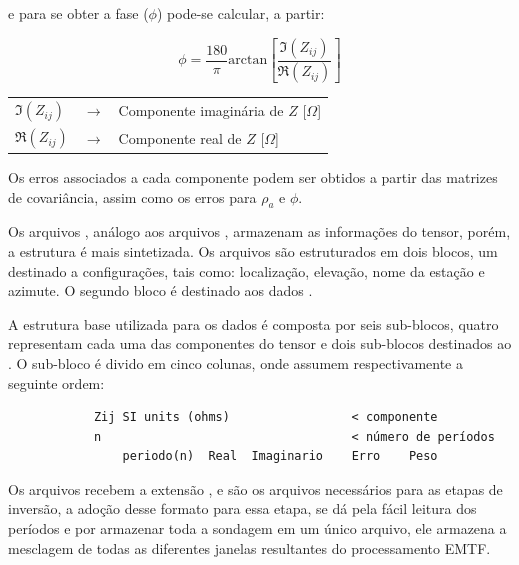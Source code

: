         \noindent e para se obter a fase ($\phi$) pode-se calcular, a partir:
        
        \begin{equation}
         \phi = \dfrac{180}{\pi} \textrm{arctan}\left [\dfrac{\Im(Z_{ij})}{\Re(Z_{ij})} \right ]
        \end{equation}

        {\footnotesize \noindent
            \begin{table}[H]
                \begin{tabular*}{5cm}{p{.9cm}p{0.1cm}p{10cm}}
                    {\footnotesize $\Im(Z_{ij})$}  & {\footnotesize $\rightarrow$} & {\footnotesize Componente imaginária de $Z$ [$\Omega$]}\\
                    {\footnotesize $\Re(Z_{ij})$}  & {\footnotesize $\rightarrow$} & {\footnotesize Componente real de  $Z$ [$\Omega$]}\\
                \end{tabular*}
            \end{table}}
        
        Os erros associados a cada componente podem ser obtidos a partir das matrizes de covariância, assim como os erros para $\rho_a$ e $\phi$.
        
        Os arquivos , análogo aos arquivos , armazenam as informações do tensor, porém, a estrutura é mais sintetizada. Os arquivos são estruturados em dois blocos, um destinado a configurações, tais como: localização, elevação, nome da estação e azimute. O segundo bloco é destinado aos dados \cite{j-format}.
        
        A estrutura base utilizada para os dados é composta por seis sub-blocos, quatro representam cada uma das componentes do tensor e dois sub-blocos destinados ao . O sub-bloco é divido em cinco colunas, onde assumem respectivamente a seguinte ordem: 
        
\begin{footnotesize}        
\begin{verbatim}
            Zij SI units (ohms)                 < componente
            n                                   < número de períodos
                periodo(n)  Real  Imaginario    Erro    Peso
\end{verbatim}
\end{footnotesize}
               
        Os arquivos  recebem a extensão , e são os arquivos necessários para as etapas de inversão, a adoção desse formato para essa etapa, se dá pela fácil leitura dos períodos e por armazenar toda a sondagem em um único arquivo, ele armazena a mesclagem de todas as diferentes janelas resultantes do processamento EMTF.
        
